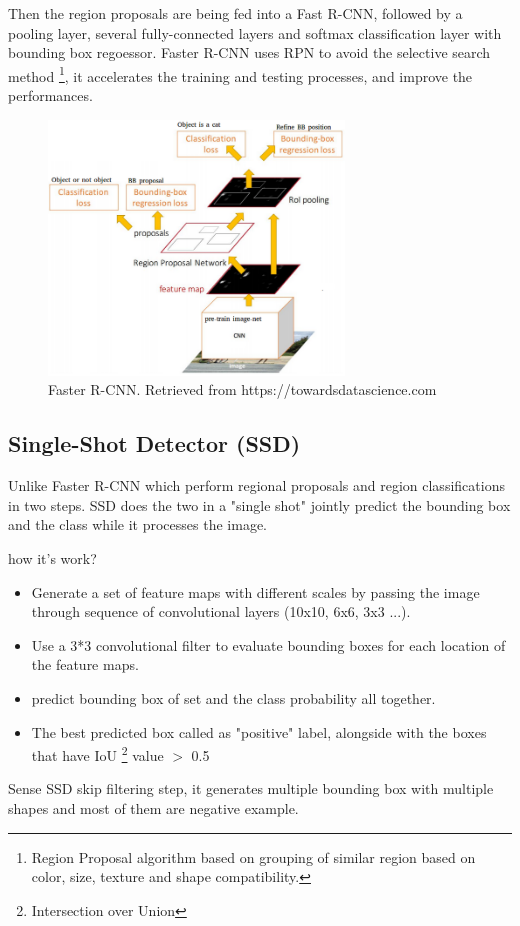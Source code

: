 \documentclass[12pt]{report}
\begin{document}
Then the region proposals are being fed into a Fast R-CNN, followed by a pooling layer, several fully-connected layers
and softmax classification layer with bounding box regoessor.
Faster R-CNN uses RPN to avoid the 
selective search method \footnote{ Region Proposal algorithm based on grouping of similar region based on color, size, texture and shape compatibility.}, 
it accelerates the training and testing 
processes, and improve the performances. \cite{Ren2017a}
\begin{figure}[h]
    \centering
    \includegraphics[width=0.7\textwidth]{./images/frcnn.png}
    \caption{Faster R-CNN. Retrieved from https://towardsdatascience.com}
    \label{fig:frcnn}
\end{figure} 

\subsection{Single-Shot Detector (SSD)}

Unlike Faster R-CNN which perform regional proposals 
and region classifications in two steps. SSD does the two in a "single shot"
jointly predict the bounding box and the class while it processes the image.

how it's work?
\begin{itemize}
    \item Generate a set of feature maps with different scales 
    by passing the image through sequence of convolutional layers (10x10, 6x6, 3x3 ...).
    \item Use a 3*3 convolutional filter to evaluate bounding boxes for each location of the feature maps.
    \item predict bounding box of set and the class probability all together.
    \item The best predicted box called as "positive" label, alongside with
    the boxes that have IoU \footnote{Intersection over Union } value $>$ 0.5 
\end{itemize}
Sense SSD skip filtering step, it generates multiple bounding box with multiple shapes
and most of them are negative example.
\end{document}
